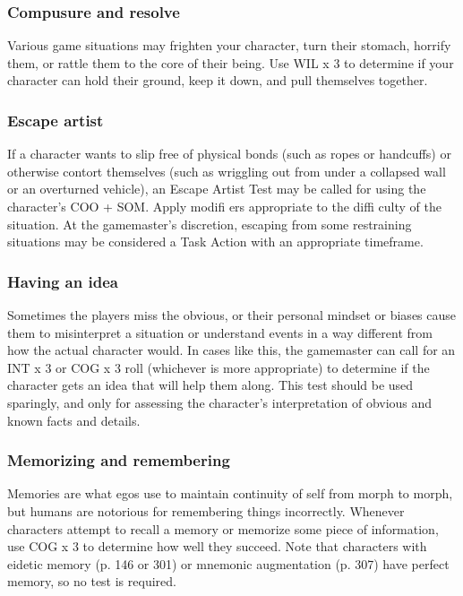 \subsubsection{Compusure and resolve}
\label{sec:skills:composure-and-resolve}

Various game situations may frighten your character, turn their stomach, horrify them, or rattle them to the core of their being. Use WIL x 3 to determine if your character can hold their ground, keep it down, and
pull themselves together.


\subsubsection{Escape artist}
\label{sec:skills:escape-artist}

If a character wants to slip free of physical bonds (such as ropes or handcuffs) or otherwise contort themselves (such as wriggling out from under a collapsed wall or an overturned vehicle), an Escape Artist Test may be
called for using the character’s COO + SOM. Apply modifi ers appropriate to the diffi culty of the situation. At the gamemaster’s discretion, escaping from some restraining situations may be considered a Task Action with an appropriate timeframe.


\subsubsection{Having an idea}
\label{sec:skills:having-an-idea}

Sometimes the players miss the obvious, or their personal mindset or biases cause them to misinterpret a situation or understand events in a way different from how the actual character would. In cases like this, the gamemaster can call for an INT x 3 or COG x 3 roll (whichever is more appropriate) to determine if the character gets an idea that will help them along. This test should be used sparingly, and only for assessing the character’s interpretation of obvious and known facts and details.


\subsubsection{Memorizing and remembering}
\label{sec:skills:memorizing-and-remembering}

Memories are what egos use to maintain continuity of self from morph to morph, but humans are notorious for remembering things incorrectly. Whenever characters attempt to recall a memory or memorize some piece of information, use COG x 3 to determine how well they succeed. Note that characters with eidetic memory (p. 146 or 301) or mnemonic augmentation (p. 307) have perfect memory, so no test is required.

